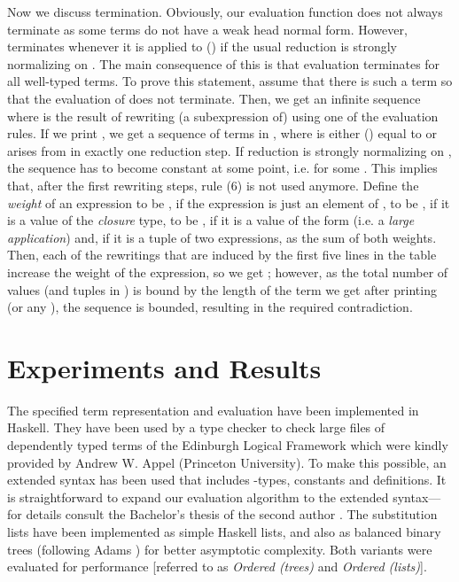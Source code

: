 \documentclass[submission,copyright,creativecommons]{eptcs}
\newcommand{\lab}[1]{\mbox{(#1)}}
\begin{document}
Now we discuss termination. Obviously, our evaluation function  does not always terminate as some terms do not have a weak head normal form. However,  terminates whenever it is applied to () if the usual  reduction is strongly normalizing on . 
The main consequence of this is that evaluation terminates for all well-typed terms. To prove this statement, assume that there is such a term  so that the evaluation of  does not terminate. 
Then, we get an infinite sequence  where  is the result of rewriting (a subexpression of)  using one of the evaluation rules. If we print , we get a sequence  of terms in , where  is either () equal to  or arises from  in exactly one  reduction step. If  reduction is strongly normalizing on , the sequence has to become constant at some point, i.e.  for some . This implies that, after the first  rewriting steps, rule \lab 6 is not used anymore. Define the \emph{weight}  of an expression  to be , if the expression is just an element of , to be , if it is a value of the \emph{closure} type, to be , if it is a value of the form  (i.e. a \emph{large application}) and, if it is a tuple of two expressions, as the sum of both weights. Then, each of the rewritings that are induced by the first five lines in the table increase the weight of the expression, so we get ;  however, as the total number of values (and tuples in ) is bound by the length of the term we get after printing  (or any ), the sequence is bounded, resulting in the required contradiction.















\section{Experiments and Results}
\label{sec:experiments}

The specified term representation and evaluation have been implemented
in Haskell. They have been used by a type checker to check large files
of dependently
typed terms of the Edinburgh Logical Framework which were kindly
provided by Andrew W. Appel (Princeton University). To make this
possible, an extended syntax has been used that includes -types, constants and definitions. It is straightforward to expand our
evaluation algorithm to the extended syntax---for details consult the
Bachelor's thesis of the second author \cite{kraus:bachelor}. 
The substitution lists
have been implemented as simple Haskell lists, and also as balanced
binary trees (following Adams \cite{adams:jfp93})
for better asymptotic complexity.  Both variants were
evaluated for performance 
[referred to as \emph{Ordered (trees)} and \emph{Ordered (lists)}].
\end{document}
